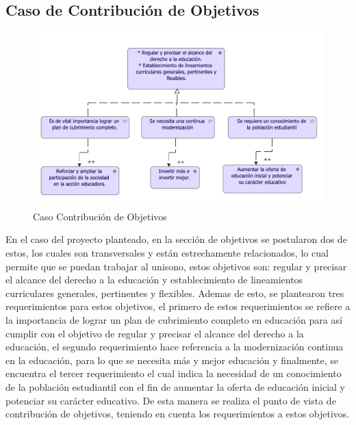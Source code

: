 
\subsection{Caso  de Contribución de Objetivos}
\begin{figure}[h!]
	\centering
	\includegraphics[width=1.0\linewidth]{imgs/motivacion/ContriObjetivos/contriObjetivos.pdf}
	\caption{Caso Contribución de Objetivos}
\end{figure}

En el caso del proyecto planteado, en la sección de objetivos se postularon dos de estos, los cuales son transversales y están estrechamente relacionados, lo cual permite que se puedan trabajar al unisono, estos objetivos son: regular y precisar el alcance del derecho a la educación y establecimiento de lineamientos curriculares generales, pertinentes y flexibles. Ademas de esto, se plantearon tres requerimientos para estos objetivos, el primero de estos requerimientos se refiere a la importancia de lograr un plan de cubrimiento completo en educación para así cumplir con el objetivo de regular y precisar el alcance del derecho a la educación, el segundo requerimiento hace referencia a la modernización continua en la educación, para lo que se necesita más y mejor educación y finalmente, se encuentra el tercer requerimiento el cual indica la necesidad de un conocimiento de la población estudiantil con el fin de aumentar la oferta de educación inicial y potenciar su carácter educativo. De esta manera se realiza el punto de vista de contribución de objetivos, teniendo en cuenta los requerimientos a estos objetivos.
